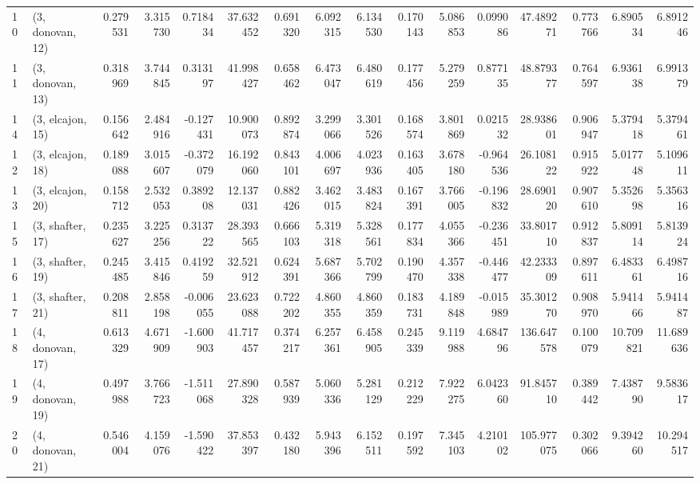 \begin{tabular}{llrrrrrrrrrrrrrr}
10 &  (3, donovan, 12) &   0.279531 &  3.315730 &  0.718434 &  37.632452 &  0.691320 &   6.092315 &  6.134530 &  0.170143 &  5.086853 &  0.099086 &   47.489271 &  0.773766 &   6.890534 &   6.891246 \\
11 &  (3, donovan, 13) &   0.318969 &  3.744845 &  0.313197 &  41.998427 &  0.658462 &   6.473047 &  6.480619 &  0.177456 &  5.279259 &  0.877135 &   48.879377 &  0.764597 &   6.936138 &   6.991379 \\
14 &  (3, elcajon, 15) &   0.156642 &  2.484916 & -0.127431 &  10.900073 &  0.892874 &   3.299066 &  3.301526 &  0.168574 &  3.801869 &  0.021532 &   28.938601 &  0.906947 &   5.379418 &   5.379461 \\
12 &  (3, elcajon, 18) &   0.189088 &  3.015607 & -0.372079 &  16.192060 &  0.843101 &   4.006697 &  4.023936 &  0.163405 &  3.678180 & -0.964536 &   26.108122 &  0.915922 &   5.017748 &   5.109611 \\
13 &  (3, elcajon, 20) &   0.158712 &  2.532053 &  0.389208 &  12.137031 &  0.882426 &   3.462015 &  3.483824 &  0.167391 &  3.766005 & -0.196832 &   28.690120 &  0.907610 &   5.352698 &   5.356316 \\
15 &  (3, shafter, 17) &   0.235627 &  3.225256 &  0.313722 &  28.393565 &  0.666103 &   5.319318 &  5.328561 &  0.177834 &  4.055366 & -0.236451 &   33.801710 &  0.912837 &   5.809114 &   5.813924 \\
16 &  (3, shafter, 19) &   0.245485 &  3.415846 &  0.419259 &  32.521912 &  0.624391 &   5.687366 &  5.702799 &  0.190470 &  4.357338 & -0.446477 &   42.233309 &  0.897611 &   6.483361 &   6.498716 \\
17 &  (3, shafter, 21) &   0.208811 &  2.858198 & -0.006055 &  23.623088 &  0.722202 &   4.860355 &  4.860359 &  0.183731 &  4.189848 & -0.015989 &   35.301270 &  0.908970 &   5.941466 &   5.941487 \\
18 &  (4, donovan, 17) &   0.613329 &  4.671909 & -1.600903 &  41.717457 &  0.374217 &   6.257361 &  6.458905 &  0.245339 &  9.119988 &  4.684796 &  136.647578 &  0.100079 &  10.709821 &  11.689636 \\
19 &  (4, donovan, 19) &   0.497988 &  3.766723 & -1.511068 &  27.890328 &  0.587939 &   5.060336 &  5.281129 &  0.212229 &  7.922275 &  6.042360 &   91.845710 &  0.389442 &   7.438790 &   9.583617 \\
20 &  (4, donovan, 21) &   0.546004 &  4.159076 & -1.590422 &  37.853397 &  0.432180 &   5.943396 &  6.152511 &  0.197592 &  7.345103 &  4.210102 &  105.977075 &  0.302066 &   9.394260 &  10.294517 \\

\end{tabular}
